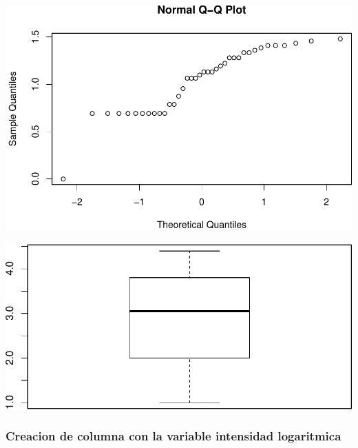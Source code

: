 \documentclass[11pt,]{article}
\newenvironment{Shaded}{\begin{snugshade}}{\end{snugshade}}
\newcommand{\KeywordTok}[1]{\textcolor[rgb]{0.13,0.29,0.53}{\textbf{#1}}}
\newcommand{\StringTok}[1]{\textcolor[rgb]{0.31,0.60,0.02}{#1}}
\newcommand{\OperatorTok}[1]{\textcolor[rgb]{0.81,0.36,0.00}{\textbf{#1}}}
\newcommand{\NormalTok}[1]{#1}
\begin{document}
\includegraphics{proyecto_files/figure-latex/unnamed-chunk-22-4.pdf}

\begin{Shaded}
\end{Shaded}

\includegraphics{proyecto_files/figure-latex/unnamed-chunk-22-5.pdf}

\subsubsection{Creacion de columna con la variable intensidad
logaritmica}\label{creacion-de-columna-con-la-variable-intensidad-logaritmica}

\begin{Shaded}
\end{Shaded}
\end{document}
